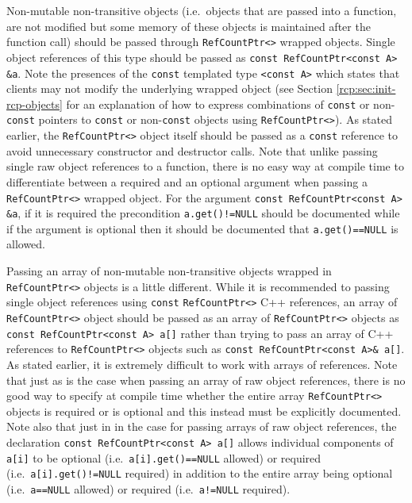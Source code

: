 Non-mutable non-transitive objects (i.e.~objects that are passed into
a function, are not modified but some memory of these objects is
maintained after the function call) should be passed through
{}\texttt{Ref\-Count\-Ptr<>} wrapped objects.  Single object
references of this type should be passed as {}\texttt{const
Ref\-Count\-Ptr<const A> \&a}.  Note the presences of the
{}\texttt{const} templated type {}\texttt{<const A>} which states that
clients may not modify the underlying wrapped object (see Section
{}\ref{rcp:sec:init-rcp-objects} for an explanation of how to express
combinations of {}\texttt{const} or non-{}\texttt{const} pointers to
{}\texttt{const} or non-{}\texttt{const} objects using
{}\texttt{Ref\-Count\-Ptr<>}).  As stated earlier, the
{}\texttt{Ref\-Count\-Ptr<>} object itself should be passed as a
{}\texttt{const} reference to avoid unnecessary constructor and
destructor calls.  Note that unlike passing single raw object
references to a function, there is no easy way at compile time to
differentiate between a required and an optional argument when passing
a {}\texttt{Ref\-Count\-Ptr<>} wrapped object.  For the argument
{}\texttt{const Ref\-Count\-Ptr<const A> \&a}, if it is required the
precondition {}\texttt{a.get()!=NULL} should be documented while if
the argument is optional then it should be documented that
{}\texttt{a.get()==NULL} is allowed.

Passing an array of non-mutable non-transitive objects wrapped in
{}\texttt{Ref\-Count\-Ptr<>} objects is a little different.  While it
is recommended to passing single object references using
{}\texttt{const} {}\texttt{Ref\-Count\-Ptr<>} C++ references, an array
of {}\texttt{Ref\-Count\-Ptr<>} object should be passed as an array of
{}\texttt{Ref\-Count\-Ptr<>} objects as {}\texttt{const
Ref\-Count\-Ptr<const A> a[]} rather than trying to pass an array of
C++ references to {}\texttt{Ref\-Count\-Ptr<>} objects such as
{}\texttt{const Ref\-Count\-Ptr<const A>\& a[]}.  As stated earlier,
it is extremely difficult to work with arrays of references.  Note
that just as is the case when passing an array of raw object
references, there is no good way to specify at compile time whether
the entire array {}\texttt{Ref\-Count\-Ptr<>} objects is required or
is optional and this instead must be explicitly documented.  Note also
that just in in the case for passing arrays of raw object references,
the declaration {}\texttt{const Ref\-Count\-Ptr<const A> a[]} allows
individual components of {}\texttt{a[i]} to be optional
(i.e.~{}\texttt{a[i].get()==NULL} allowed) or required
(i.e.~{}\texttt{a[i].get()!=NULL} required) in addition to the entire
array being optional (i.e.~{}\texttt{a==NULL} allowed) or required
(i.e.~{}\texttt{a!=NULL} required).


